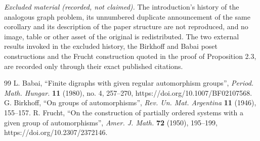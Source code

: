 \documentclass[10pt,a4paper]{amsart}
\theoremstyle{plain}
\theoremstyle{definition}
\theoremstyle{remark}
\begin{document}
\noindent\textit{Excluded material (recorded, not claimed).} The introduction's history of the analogous graph problem, its unnumbered duplicate announcement of the same corollary and its description of the paper structure are not reproduced, and no image, table or other asset of the original is redistributed. The two external results invoked in the excluded history, the Birkhoff and Babai poset constructions and the Frucht construction quoted in the proof of Proposition 2.3, are recorded only through their exact published citations.
\begin{thebibliography}{99}
 L. Babai, ``Finite digraphs with given regular automorphism groups'', \emph{Period. Math. Hungar.} \textbf{11} (1980), no. 4, 257--270, https://doi.org/10.1007/BF02107568.
 G. Birkhoff, ``On groups of automorphisms'', \emph{Rev. Un. Mat. Argentina} \textbf{11} (1946), 155--157.
 R. Frucht, ``On the construction of partially ordered systems with a given group of automorphisms'', \emph{Amer. J. Math.} \textbf{72} (1950), 195--199, https://doi.org/10.2307/2372146.
\end{thebibliography}
\end{document}
